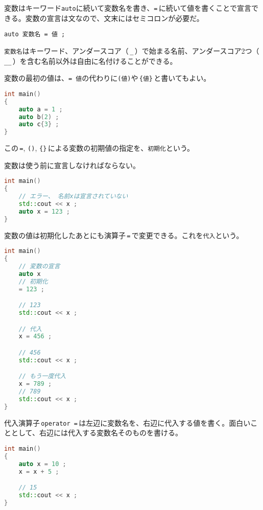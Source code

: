 変数はキーワード\texttt{auto}に続いて変数名を書き、\texttt{=}\,に続いて値を書くことで宣言できる。変数の宣言は文なので、文末にはセミコロンが必要だ。

\begin{lstlisting}[style=grammar]
auto 変数名 = 値 ;
\end{lstlisting}

\texttt{変数名}はキーワード、アンダースコア（\,\texttt{\_}\,）で始まる名前、アンダースコア2つ（\,\texttt{\_\_}\,）を含む名前以外は自由に名付けることができる。

変数の最初の値は、\texttt{= 値}の代わりに\texttt{(値)}や\,\texttt{\{値\}}\,と書いてもよい。

\begin{lstlisting}[language={C++}]
int main()
{
    auto a = 1 ;
    auto b(2) ;
    auto c{3} ;
}
\end{lstlisting}

この\,\texttt{=}, \texttt{()}, \texttt{\{\}}\,による変数の初期値の指定を、\texttt{初期化}という。

変数は使う前に宣言しなければならない。

\begin{lstlisting}[language={C++}]
int main()
{
    // エラー、 名前xは宣言されていない
    std::cout << x ;
    auto x = 123 ;
}
\end{lstlisting}

変数の値は初期化したあとにも演算子\,\texttt{=}\,で変更できる。これを\texttt{代入}という。

\begin{lstlisting}[language={C++}]
int main()
{
    // 変数の宣言
    auto x
    // 初期化
    = 123 ;

    // 123
    std::cout << x ;

    // 代入
    x = 456 ;

    // 456
    std::cout << x ;

    // もう一度代入
    x = 789 ;
    // 789
    std::cout << x ;
}
\end{lstlisting}

代入演算子\,\texttt{operator =}\,は左辺に変数名を、右辺に代入する値を書く。面白いこととして、右辺には代入する変数名そのものを書ける。

\begin{lstlisting}[language={C++}]
int main()
{
    auto x = 10 ;
    x = x + 5 ;

    // 15
    std::cout << x ;
}
\end{lstlisting}

